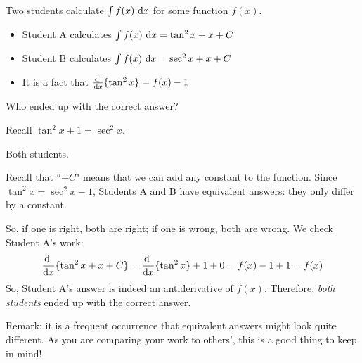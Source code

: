\begin{Mquestion} Two students calculate $\int f(x)\ \dee{x}$ for some function $f(x)$.
\begin{itemize}
\item Student A calculates $\int f(x)\ \dee{x} = \tan^2 x + x + C$
\item Student B calculates $\int f(x)\ \dee{x} = \sec^2 x + x + C$
\item It is a fact that $\diff{}{x}\{\tan^2 x\} = f(x)-1$
\end{itemize}
Who ended up with the correct answer?
\end{Mquestion}
\begin{hint} Recall $\tan^2x+1=\sec^2 x$.
\end{hint}
\begin{answer}
Both students.
\end{answer}
\begin{solution}
Recall that ``$+C$" means that we can add any constant to the function. Since $\tan^2 x = \sec^2 x - 1$, Students A and B have equivalent answers: they only differ by a constant.

So, if one is right, both are right; if one is wrong, both are wrong. We check Student A's work:
\[\diff{}{x}\{\tan^2 x + x + C\}=\diff{}{x}\{\tan^2 x\} +1 + 0 = f(x)-1+1=f(x)\]
So, Student A's answer is indeed an antiderivative of $f(x)$. Therefore, \emph{both students} ended up with the correct answer.

Remark: it is a frequent occurrence that equivalent answers might look quite different. As you are comparing your work to others', this is a good thing to keep in mind!
\end{solution}



